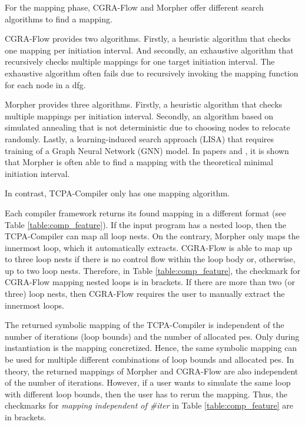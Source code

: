 For the mapping phase, CGRA-Flow and Morpher offer different search algorithms to find a mapping.

CGRA-Flow provides two algorithms.
Firstly, a heuristic algorithm that checks one mapping per initiation interval.
And secondly, an exhaustive algorithm that recursively checks multiple mappings for one target initiation interval.
The exhaustive algorithm often fails due to recursively invoking the mapping function for each node in a \ac{dfg}.

Morpher provides three algorithms.
Firstly, a heuristic algorithm that checks multiple mappings per initiation interval.
Secondly, an algorithm based on simulated annealing that is not deterministic due to choosing nodes to relocate randomly.
Lastly, a learning-induced search approach (LISA) that requires training of a Graph Neural Network (GNN) model.
In papers \cite{3_MorpherCODAI} and \cite{6_MorpherWOSET}, it is shown that Morpher is often able to find a mapping with the theoretical minimal initiation interval.

In contrast, TCPA-Compiler only has one mapping algorithm.


Each compiler framework returns its found mapping in a different format (see Table \ref{table:comp_feature}).
If the input program has a nested loop, then the TCPA-Compiler can map all loop nests.
On the contrary, Morpher only maps the innermost loop, which it automatically extracts.
CGRA-Flow is able to map up to three loop nests if there is no control flow within the loop body or, otherwise, up to two loop nests.
Therefore, in Table \ref{table:comp_feature}, the checkmark for CGRA-Flow mapping nested loops is in brackets.
If there are more than two (or three) loop nests, then CGRA-Flow requires the user to manually extract the innermost loops.

The returned symbolic mapping of the TCPA-Compiler is independent of the number of iterations (\ie loop bounds) and the number of allocated \acp{pe}.
Only during instantiation is the mapping concretized.
Hence, the same symbolic mapping can be used for multiple different combinations of loop bounds and allocated \acp{pe}.
In theory, the returned mappings of Morpher and CGRA-Flow are also independent of the number of iterations.
However, if a user wants to simulate the same loop with different loop bounds, then the user has to rerun the mapping.
Thus, the checkmarks for \textit{mapping independent of \#iter} in Table \ref{table:comp_feature} are in brackets.

